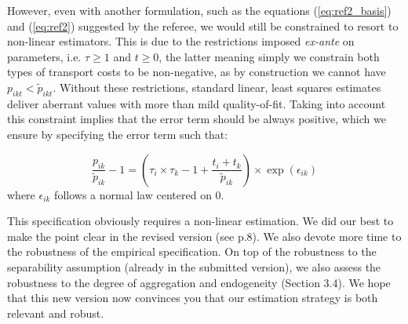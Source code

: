 \documentclass[a4paper,11pt]{article}
\begin{document}
However, even with another formulation, such as the equations (\ref{eq:ref2_basis}) and (\ref{eq:ref2}) suggested by the referee, we would still be constrained to resort to non-linear estimators. This is due to the restrictions imposed \textit{ex-ante} on parameters, i.e. $\tau \geq 1$ and $t\geq 0$, the latter meaning simply we constrain both types of transport costs to be non-negative, as by construction we cannot have $p_{ikt} < \widetilde{p}_{ikt}$. Without these restrictions, standard linear, least squares estimates deliver aberrant values with more than mild quality-of-fit. Taking into account this constraint implies that the error term should be always positive, which we ensure by specifying the error term such that:

\begin{equation*}
\frac{p_{ik}}{\widetilde{p}_{ik}}-1 =\left(\tau_{i}\times \tau_{k} -1+\frac{t_{i} + t_{k}}{\widetilde{p}_{ik}} \right)\times \exp(\epsilon_{ik})
\end{equation*}
\noindent where $\epsilon_{ik}$ follows a normal law centered on 0.

This specification obviously requires a non-linear estimation. We did our best to make the point clear in the revised version (see p.8). We also devote more time to the robustness of the empirical specification. On top of the robustness to the separability assumption (already in the submitted version), we also assess the robustness to the degree of aggregation and endogeneity (Section 3.4). We hope that this new version now convinces you that our estimation strategy is both relevant and robust.



\newpage


\end{document}
